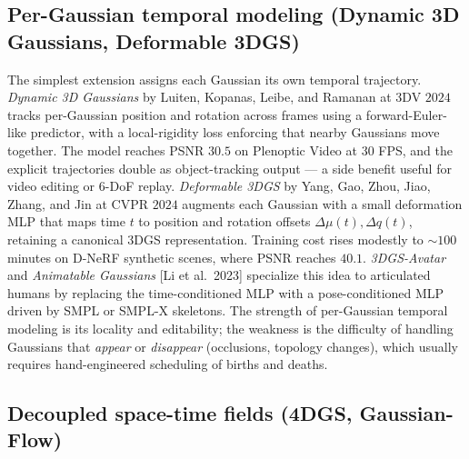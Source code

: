 \documentclass{article}
\begin{document}
\subsection{Per-Gaussian temporal modeling (Dynamic 3D Gaussians, Deformable 3DGS)}\label{per-gaussian-temporal-modeling-dynamic-3d-gaussians-deformable-3dgs}

The simplest extension assigns each Gaussian its own temporal trajectory. \emph{Dynamic 3D Gaussians} by Luiten, Kopanas, Leibe, and Ramanan at 3DV \(2024\) \cite{luiten2024dynamic3dgaussians} tracks per-Gaussian position and rotation across frames using a forward-Euler-like predictor, with a local-rigidity loss enforcing that nearby Gaussians move together. The model reaches PSNR \(30.5\) on Plenoptic Video at \(30\) FPS, and the explicit trajectories double as object-tracking output --- a side benefit useful for video editing or 6-DoF replay. \emph{Deformable 3DGS} by Yang, Gao, Zhou, Jiao, Zhang, and Jin at CVPR \(2024\) \cite{yang2024deformable3dgaussi} augments each Gaussian with a small deformation MLP that maps time \(t\) to position and rotation offsets \(\Delta\mu(t),\Delta q(t)\), retaining a canonical 3DGS representation. Training cost rises modestly to \(\sim\!100\) minutes on D-NeRF synthetic scenes, where PSNR reaches \(40.1\). \emph{3DGS-Avatar} \cite{qian20243dgsavataranimatab} and \emph{Animatable Gaussians} {[}Li et al.~2023{]} specialize this idea to articulated humans by replacing the time-conditioned MLP with a pose-conditioned MLP driven by SMPL or SMPL-X skeletons. The strength of per-Gaussian temporal modeling is its locality and editability; the weakness is the difficulty of handling Gaussians that \emph{appear} or \emph{disappear} (occlusions, topology changes), which usually requires hand-engineered scheduling of births and deaths.

\subsection{Decoupled space-time fields (4DGS, Gaussian-Flow)}\label{decoupled-space-time-fields-4dgs-gaussian-flow}
\end{document}

